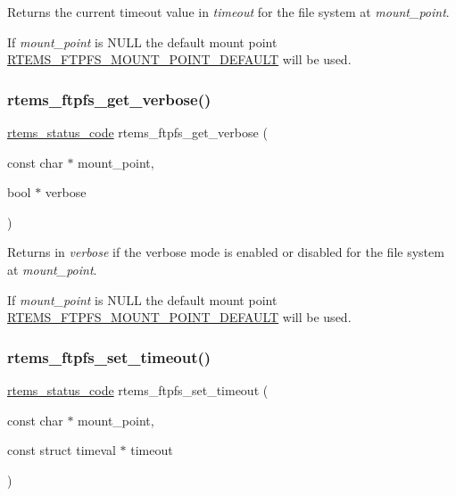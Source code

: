 Returns the current timeout value in {\itshape timeout} for the file system at {\itshape mount\+\_\+point}. 

If {\itshape mount\+\_\+point} is {\ttfamily N\+U\+LL} the default mount point \mbox{\hyperlink{group__rtems__ftpfs_ga62b0e39dcbe47ed7a94eb4d44848dda6}{R\+T\+E\+M\+S\+\_\+\+F\+T\+P\+F\+S\+\_\+\+M\+O\+U\+N\+T\+\_\+\+P\+O\+I\+N\+T\+\_\+\+D\+E\+F\+A\+U\+LT}} will be used. \mbox{\label{group__rtems__ftpfs_gaf963f45e8ceb6fe79e7a8c8e8a7a3827}} 
\subsubsection{\texorpdfstring{rtems\_ftpfs\_get\_verbose()}{rtems\_ftpfs\_get\_verbose()}}
{\footnotesize\ttfamily \mbox{\hyperlink{group__ClassicStatus_ga545d41846817eaba6143d52ee4d9e9fe}{rtems\+\_\+status\+\_\+code}} rtems\+\_\+ftpfs\+\_\+get\+\_\+verbose (\begin{DoxyParamCaption}\item[{const char $\ast$}]{mount\+\_\+point,  }\item[{bool $\ast$}]{verbose }\end{DoxyParamCaption})}



Returns in {\itshape verbose} if the verbose mode is enabled or disabled for the file system at {\itshape mount\+\_\+point}. 

If {\itshape mount\+\_\+point} is {\ttfamily N\+U\+LL} the default mount point \mbox{\hyperlink{group__rtems__ftpfs_ga62b0e39dcbe47ed7a94eb4d44848dda6}{R\+T\+E\+M\+S\+\_\+\+F\+T\+P\+F\+S\+\_\+\+M\+O\+U\+N\+T\+\_\+\+P\+O\+I\+N\+T\+\_\+\+D\+E\+F\+A\+U\+LT}} will be used. \mbox{\label{group__rtems__ftpfs_gaadeae39927ef1277b2ac47c6e796a07c}} 
\subsubsection{\texorpdfstring{rtems\_ftpfs\_set\_timeout()}{rtems\_ftpfs\_set\_timeout()}}
{\footnotesize\ttfamily \mbox{\hyperlink{group__ClassicStatus_ga545d41846817eaba6143d52ee4d9e9fe}{rtems\+\_\+status\+\_\+code}} rtems\+\_\+ftpfs\+\_\+set\+\_\+timeout (\begin{DoxyParamCaption}\item[{const char $\ast$}]{mount\+\_\+point,  }\item[{const struct timeval $\ast$}]{timeout }\end{DoxyParamCaption})}



